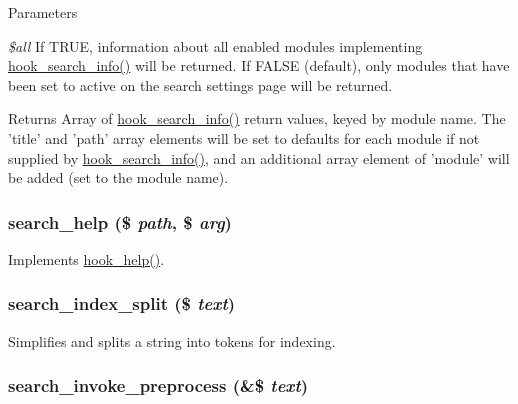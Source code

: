 \begin{DoxyParams}{Parameters}
\item[{\em \$all}]If TRUE, information about all enabled modules implementing \hyperlink{group__search_ga37b761616f2cad4796891008f2b374f3}{hook\_\-search\_\-info()} will be returned. If FALSE (default), only modules that have been set to active on the search settings page will be returned.\end{DoxyParams}
\begin{DoxyReturn}{Returns}
Array of \hyperlink{group__search_ga37b761616f2cad4796891008f2b374f3}{hook\_\-search\_\-info()} return values, keyed by module name. The 'title' and 'path' array elements will be set to defaults for each module if not supplied by \hyperlink{group__search_ga37b761616f2cad4796891008f2b374f3}{hook\_\-search\_\-info()}, and an additional array element of 'module' will be added (set to the module name). 
\end{DoxyReturn}
\hypertarget{search_8module_aa8106bfd7c3a1254dcb89195ab219b5b}{
\subsubsection[{search\_\-help}]{\setlength{\rightskip}{0pt plus 5cm}search\_\-help (\$ {\em path}, \/  \$ {\em arg})}}
\label{search_8module_aa8106bfd7c3a1254dcb89195ab219b5b}
Implements \hyperlink{group__hooks_ga5589c2714a782738e8851c4c90231f0e}{hook\_\-help()}. \hypertarget{search_8module_a5435e73f4dc935b243e2e08f34a57d1d}{
\subsubsection[{search\_\-index\_\-split}]{\setlength{\rightskip}{0pt plus 5cm}search\_\-index\_\-split (\$ {\em text})}}
\label{search_8module_a5435e73f4dc935b243e2e08f34a57d1d}
Simplifies and splits a string into tokens for indexing. \hypertarget{search_8module_ae0bcee62601fbc35d2651764a04e5591}{
\subsubsection[{search\_\-invoke\_\-preprocess}]{\setlength{\rightskip}{0pt plus 5cm}search\_\-invoke\_\-preprocess (\&\$ {\em text})}}
